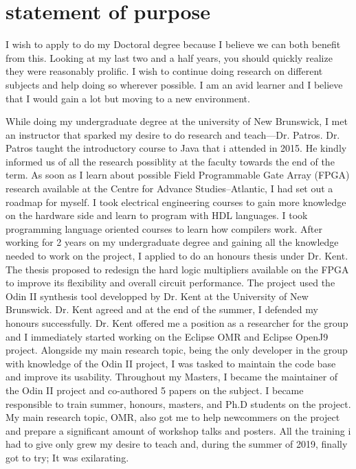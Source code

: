 \documentclass[english,letterpaper]{deedy-resume-openfont}
\begin{document}
{\justifying
\doublespacing
\color{black}
\fontsize{12pt}{12pt}
\selectfont

\vspace*{60pt}

\section{statement of purpose}

\vspace{12pt}

I wish to apply to do my Doctoral degree because I believe we can both benefit from this.
Looking at my last two and a half years, you should quickly realize they were reasonably prolific.
I wish to continue doing research on different subjects and help doing so wherever possible.
I am an avid learner and I believe that I would gain a lot but moving to a new environment.

While doing my undergraduate degree at the university of New Brunswick, I met an instructor that sparked my desire to do research and teach---Dr. Patros.
Dr. Patros taught the introductory course to Java that i attended in 2015.
He kindly informed us of all the research possiblity at the faculty towards the end of the term.
As soon as I learn about possible Field Programmable Gate Array (FPGA) research available at the Centre for Advance Studies--Atlantic, I had set out a roadmap for myself.
I took electrical engineering courses to gain more knowledge on the hardware side and learn to program with HDL languages.
I took programming language oriented courses to learn how compilers work.
After working for 2 years on my undergraduate degree and gaining all the knowledge needed to work on the project, I applied to do an honours thesis under Dr. Kent.
The thesis proposed to redesign the hard logic multipliers available on the FPGA to improve its flexibility and overall circuit performance.
The project used the Odin II synthesis tool developped by Dr. Kent at the University of New Brunswick.
Dr. Kent agreed and at the end of the summer, I defended my honours successfully.
Dr. Kent offered me a position as a researcher for the group and I immediately started working on the Eclipse OMR and Eclipse OpenJ9 project.
Alongside my main research topic, being the only developer in the group with knowledge of the Odin II project, I was tasked to maintain the code base and improve its usability.
Throughout my Masters, I became the maintainer of the Odin II project and co-authored 5 papers on the subject.
I became responsible to train summer, honours, masters, and Ph.D students on the project.
My main research topic, OMR, also got me to help newcommers on the project and prepare a significant amount of workshop talks and posters.
All the training i had to give only grew my desire to teach and, during the summer of 2019, finally got to try; It was exilarating.

}
\end{document}
